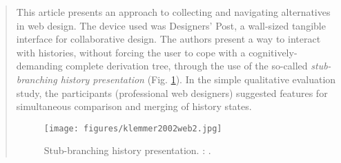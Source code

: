 		

		
% 				
						

		
% 				
				
				
		
% 				

		\begin{quote}
		\small
		This article presents an approach to collecting and navigating alternatives in 
		web design. The device used was Designers' Post,
		a wall-sized tangible interface for collaborative design. %
		The authors present a way to interact with histories, without forcing the user
		to cope with a cognitively-demanding complete derivation tree, through the use of 
		the so-called {\em stub-branching history presentation} (Fig. \ref{fig:klemmer2002web2}).
		In the simple qualitative evaluation study, the participants (professional web designers)
		suggested features for simultaneous comparison and merging of history states.
		\begin{figure}[htb]
		\begin{center}
		\texttt{[image: figures/klemmer2002web2.jpg]}
		\caption{
		Stub-branching history presentation.  
		\citeauthor{klemmer2002web}: 
		\cite{klemmer2002web}.}
		\label{fig:klemmer2002web2}
		\end{center}
		\end{figure}
 		\end{quote}
		
